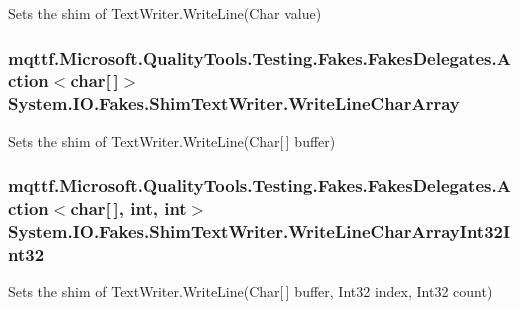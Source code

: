 Sets the shim of Text\-Writer.\-Write\-Line(\-Char value)

\hypertarget{class_system_1_1_i_o_1_1_fakes_1_1_shim_text_writer_a2fc885fa0ad5b50a8349e0a9daa8eb51}{
\subsubsection[{Write\-Line\-Char\-Array}]{\setlength{\rightskip}{0pt plus 5cm}mqttf.\-Microsoft.\-Quality\-Tools.\-Testing.\-Fakes.\-Fakes\-Delegates.\-Action$<$char\mbox{[}$\,$\mbox{]}$>$ System.\-I\-O.\-Fakes.\-Shim\-Text\-Writer.\-Write\-Line\-Char\-Array\hspace{0.3cm}{\ttfamily [set]}}}\label{class_system_1_1_i_o_1_1_fakes_1_1_shim_text_writer_a2fc885fa0ad5b50a8349e0a9daa8eb51}


Sets the shim of Text\-Writer.\-Write\-Line(\-Char\mbox{[}$\,$\mbox{]} buffer)

\hypertarget{class_system_1_1_i_o_1_1_fakes_1_1_shim_text_writer_af362f220689b969d3d8919171cf2bcd5}{
\subsubsection[{Write\-Line\-Char\-Array\-Int32\-Int32}]{\setlength{\rightskip}{0pt plus 5cm}mqttf.\-Microsoft.\-Quality\-Tools.\-Testing.\-Fakes.\-Fakes\-Delegates.\-Action$<$char\mbox{[}$\,$\mbox{]}, int, int$>$ System.\-I\-O.\-Fakes.\-Shim\-Text\-Writer.\-Write\-Line\-Char\-Array\-Int32\-Int32\hspace{0.3cm}{\ttfamily [set]}}}\label{class_system_1_1_i_o_1_1_fakes_1_1_shim_text_writer_af362f220689b969d3d8919171cf2bcd5}


Sets the shim of Text\-Writer.\-Write\-Line(\-Char\mbox{[}$\,$\mbox{]} buffer, Int32 index, Int32 count)

